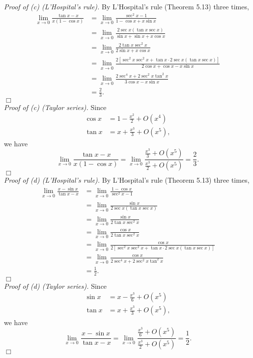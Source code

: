\documentclass{article}
\begin{document}
\emph{Proof of (c) (L'Hospital's rule).}
By L'Hospital's rule (Theorem 5.13) three times,
\begin{align*}
  \lim_{x \to 0} \frac{\tan x - x}{x(1 - \cos x)}
  &= \lim_{x \to 0} \frac{\sec^2 x - 1}{1 - \cos x + x \sin x} \\
  &= \lim_{x \to 0} \frac{2 \sec x (\tan x \sec x)}{\sin x + \sin x + x \cos x} \\
  &= \lim_{x \to 0} \frac{2 \tan x \sec^2 x}{2 \sin x + x \cos x} \\
  &= \lim_{x \to 0}
    \frac{2 [\sec^2 x \sec^2 x + \tan x \cdot 2 \sec x (\tan x \sec x)]}
    {2 \cos x + \cos x - x \sin x} \\
  &= \lim_{x \to 0} \frac{2 \sec^4 x + 2 \sec^2 x \tan^2 x}{3 \cos x - x \sin x} \\
  &= \frac{2}{3}.
\end{align*}
$\Box$ \\

\emph{Proof of (c) (Taylor series).}
Since
\begin{align*}
  \cos x &= 1 - \frac{x^2}{2} + O(x^4) \\
  \tan x &= x + \frac{x^3}{3} + O(x^5),
\end{align*}
we have
\[
  \lim_{x \to 0} \frac{\tan x - x}{x(1 - \cos x)}
  = \lim_{x \to 0} \frac{\frac{x^3}{3} + O(x^5)}{\frac{x^3}{2} + O(x^5)}
  = \frac{2}{3}.
\]
$\Box$ \\

\emph{Proof of (d) (L'Hospital's rule).}
By L'Hospital's rule (Theorem 5.13) three times,
\begin{align*}
  \lim_{x \to 0} \frac{x - \sin x}{\tan x - x}
  &= \lim_{x \to 0} \frac{1 - \cos x}{\sec^2 x - 1} \\
  &= \lim_{x \to 0} \frac{\sin x}{2 \sec x (\tan x \sec x)} \\
  &= \lim_{x \to 0} \frac{\sin x}{2 \tan x \sec^2 x} \\
  &= \lim_{x \to 0} \frac{\cos x}{2 \tan x \sec^2 x} \\
  &= \lim_{x \to 0} \frac{\cos x}{2 [\sec^2 x \sec^2 x + \tan x \cdot 2 \sec x (\tan x \sec x)]} \\
  &= \lim_{x \to 0} \frac{\cos x}{2 \sec^4 x + 2 \sec^2 x \tan^2 x} \\
  &= \frac{1}{2}.
\end{align*}
$\Box$ \\

\emph{Proof of (d) (Taylor series).}
Since
\begin{align*}
  \sin x &= x - \frac{x^3}{6} + O(x^5) \\
  \tan x &= x + \frac{x^3}{3} + O(x^5),
\end{align*}
we have
\[
  \lim_{x \to 0} \frac{x - \sin x}{\tan x - x}
  = \lim_{x \to 0} \frac{\frac{x^3}{6} + O(x^5)}{\frac{x^3}{2} + O(x^5)}
  = \frac{1}{2}.
\]
$\Box$ \\\\
\end{document}
